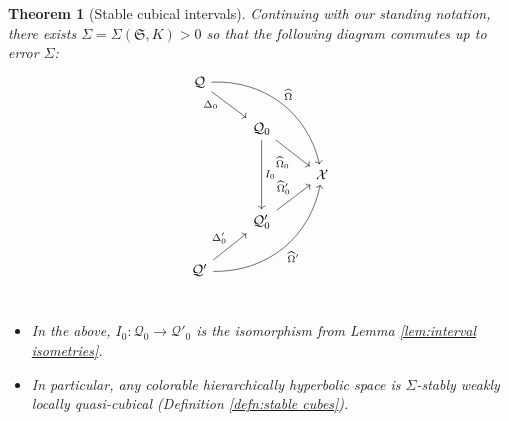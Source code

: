 \documentclass{amsart}
\newtheorem{theorem}{Theorem}[section]
\theoremstyle{definition}
\theoremstyle{remark}
\theoremstyle{definition}
\newcommand{\calQ}{\mathcal{Q}}
\newcommand{\calX}{\mathcal{X}}
\newcommand{\hO}{\widehat{\Omega}}
\begin{document}
\begin{theorem}[Stable cubical intervals]\label{thm:stable cubes}
Continuing with our standing notation, there exists $\Sigma = \Sigma(\mathfrak S, K)>0$ so that the following diagram commutes up to error $\Sigma$:
\begin{equation}\label{Phi diagram}
  \begin{tikzcd}
   \calQ \arrow[ddrr,"\hO", bend left=40] \arrow[dr,"\Delta_0 \hspace{.075in}" left] &  \\
    &\calQ_{0} \arrow[dr,"\hO_0 \hspace{.2in}" below]\arrow[dd, "I_0"] \\
    & & \calX\\
    & \calQ'_{0} \arrow[ur,"\hO'_0"] \\
    \calQ'\arrow[uurr,"\hspace{.2in} \vspace{.1in} \hO'" below, bend right=40] \arrow[ur,"\Delta'_0"] & \\
  \end{tikzcd}
  \end{equation}

\begin{itemize}
\item In the above, $I_0:\calQ_0 \to \calQ'_0$ is the isomorphism from Lemma \ref{lem:interval isometries}.
\item In particular, any colorable hierarchically hyperbolic space is $\Sigma$-stably weakly locally quasi-cubical (Definition \ref{defn:stable cubes}). 
\end{itemize}
\end{theorem}
\end{document}

